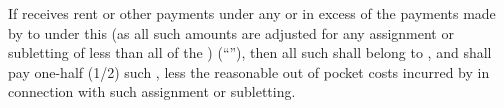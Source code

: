 If \lessee receives rent or other payments under any \permittedTransfer or \consentTransfer in excess of the payments made by \lessee to \lessor under this \lease (as all such amounts are adjusted for any assignment or subletting of less than all of the \premises) (``''), then all such \excessRent shall belong to \lessee, and \lessee shall pay \lessor one-half (1/2) such \excessRent, less the reasonable out of pocket costs incurred by \lessee in connection with such assignment or subletting.
